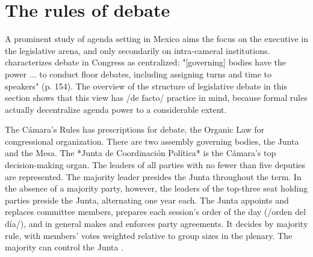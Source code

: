 \documentclass[letter,12pt]{article}
\begin{document}

\section{The rules of debate} %

A prominent study of agenda setting in Mexico aims the focus on the executive in the legislative arena, and only secondarily on intra-cameral institutions. \citet{casar.agsetting.2016} characterizes debate in Congress as centralized: "[governing] bodies have the power ... to conduct floor debates, including assigning turns and time to speakers" (p. 154). The overview of the structure of legislative debate in this section shows that this view has /de facto/ practice in mind, because formal rules actually decentralize agenda power to a considerable extent. 


The Cámara's Rules \citep{reglamentoDipMx.2019} has prescriptions for debate, the Organic Law \citep{loceum.2019} for congressional organization. There are two assembly governing bodies, the Junta and the Mesa. The *Junta de Coordinación Política* is the Cámara's top decision-making organ. The leaders of all parties with no fewer than five deputies are represented. The majority leader presides the Junta throughout the term. In the absence of a majority party, however, the leaders of the top-three seat holding parties preside the Junta, alternating one year each. The Junta appoints and replaces committee members, prepares each session's order of the day (/orden del día/), and in general makes and enforces party agreements. It decides by majority rule, with members' votes weighted relative to group sizes in the plenary. The majority can control the Junta \citep[cf.][]{cox.mccubbins.2005}.
\end{document}
